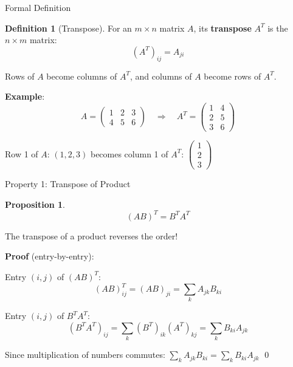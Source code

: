 \documentclass[10pt]{beamer}
\theoremstyle{definition}
\newtheorem{defi}{Definition}[section]
\newtheorem{prop}{Proposition}[section]
\newcommand{\x}[1]{\alert{\textbf{#1}}}
\begin{document}
\begin{frame}{Formal Definition}

\begin{defi}[Transpose]
For an $m \times n$ matrix $A$, its \x{transpose} $A^T$ is the $n \times m$ matrix:
$$(A^T)_{ij} = A_{ji}$$

Rows of $A$ become columns of $A^T$, and columns of $A$ become rows of $A^T$.
\end{defi}

\vspace{1em}

\x{Example}:
$$A = \begin{pmatrix} 1 & 2 & 3 \\ 4 & 5 & 6 \end{pmatrix} \quad \Rightarrow \quad A^T = \begin{pmatrix} 1 & 4 \\ 2 & 5 \\ 3 & 6 \end{pmatrix}$$

\vspace{1em}

Row 1 of $A$: $(1, 2, 3)$ becomes column 1 of $A^T$: $\begin{pmatrix} 1\\2\\3 \end{pmatrix}$

\end{frame}

\begin{frame}{Property 1: Transpose of Product}

\begin{prop}
$$(AB)^T = B^T A^T$$

The transpose of a product reverses the order!
\end{prop}

\vspace{1em}

\x{Proof} (entry-by-entry):

Entry $(i,j)$ of $(AB)^T$:
$$(AB)^T_{ij} = (AB)_{ji} = \sum_k A_{jk} B_{ki}$$

Entry $(i,j)$ of $B^T A^T$:
$$(B^T A^T)_{ij} = \sum_k (B^T)_{ik} (A^T)_{kj} = \sum_k B_{ki} A_{jk}$$

Since multiplication of numbers commutes: $\sum_k A_{jk} B_{ki} = \sum_k B_{ki} A_{jk}$ \qed

\end{frame}
\end{document}
